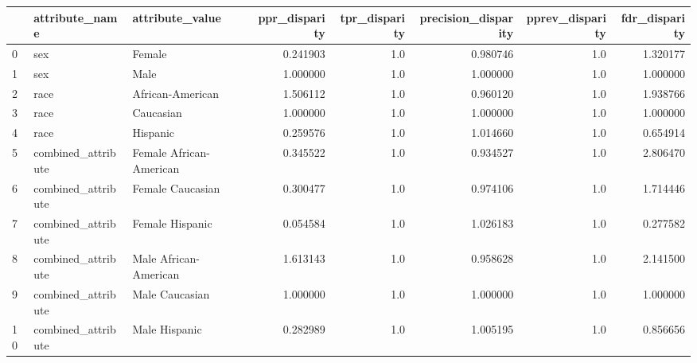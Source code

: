 \begin{tabular}{lllrrrrr}
\toprule
{} &      attribute\_name &          attribute\_value &  ppr\_disparity &  tpr\_disparity &  precision\_disparity &  pprev\_disparity &  fdr\_disparity \\
\midrule
0  &                 sex &                   Female &       0.241903 &            1.0 &             0.980746 &              1.0 &       1.320177 \\
1  &                 sex &                     Male &       1.000000 &            1.0 &             1.000000 &              1.0 &       1.000000 \\
2  &                race &         African-American &       1.506112 &            1.0 &             0.960120 &              1.0 &       1.938766 \\
3  &                race &                Caucasian &       1.000000 &            1.0 &             1.000000 &              1.0 &       1.000000 \\
4  &                race &                 Hispanic &       0.259576 &            1.0 &             1.014660 &              1.0 &       0.654914 \\
5  &  combined\_attribute &  Female African-American &       0.345522 &            1.0 &             0.934527 &              1.0 &       2.806470 \\
6  &  combined\_attribute &         Female Caucasian &       0.300477 &            1.0 &             0.974106 &              1.0 &       1.714446 \\
7  &  combined\_attribute &          Female Hispanic &       0.054584 &            1.0 &             1.026183 &              1.0 &       0.277582 \\
8  &  combined\_attribute &    Male African-American &       1.613143 &            1.0 &             0.958628 &              1.0 &       2.141500 \\
9  &  combined\_attribute &           Male Caucasian &       1.000000 &            1.0 &             1.000000 &              1.0 &       1.000000 \\
10 &  combined\_attribute &            Male Hispanic &       0.282989 &            1.0 &             1.005195 &              1.0 &       0.856656 \\
\bottomrule
\end{tabular}
